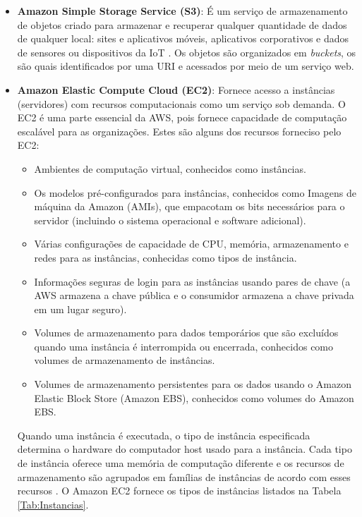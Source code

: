 \begin{itemize}

    \item \textbf{Amazon Simple Storage Service (S3)}: É um serviço de armazenamento de objetos criado para armazenar e recuperar qualquer quantidade de dados de qualquer local: sites e aplicativos móveis, aplicativos corporativos e dados de sensores ou dispositivos da IoT \cite{awsOverview}. Os objetos são organizados em \textit{buckets}, os são quais identificados por uma URI e acessados por meio de um serviço web.
    
    \item \textbf{Amazon Elastic Compute Cloud (EC2)}: Fornece acesso a instâncias (servidores) com recursos computacionais como um serviço sob demanda. O EC2 é uma parte essencial da AWS, pois fornece capacidade de computação escalável para as organizações. Estes são alguns dos recursos forneciso pelo EC2:
    \begin{itemize}
    \item Ambientes de computação virtual, conhecidos como instâncias.
    \item Os modelos pré-configurados para  instâncias, conhecidos como Imagens de máquina da Amazon (AMIs), que empacotam os bits necessários para o servidor (incluindo o sistema operacional e software adicional).
    \item Várias configurações de capacidade de CPU, memória, armazenamento e redes para as instâncias, conhecidas como tipos de instância.
    \item Informações seguras de login para as instâncias usando pares de chave (a AWS armazena a chave pública e o consumidor armazena a chave privada em um lugar seguro).
    \item Volumes de armazenamento para dados temporários que são excluídos quando uma instância é interrompida ou encerrada, conhecidos como volumes de armazenamento de instâncias.
    \item Volumes de armazenamento persistentes para os dados usando o Amazon Elastic Block Store (Amazon EBS), conhecidos como volumes do Amazon EBS.
\end{itemize}
 

Quando uma instância é executada, o tipo de instância especificada determina o hardware do computador host usado para a instância. Cada tipo de instância oferece uma memória de computação diferente e os recursos de armazenamento são agrupados em famílias de instâncias de acordo com esses recursos \cite{awsInstances}. O Amazon EC2 fornece os tipos de instâncias listados na Tabela \ref{Tab:Instancias}.


\end{itemize}
